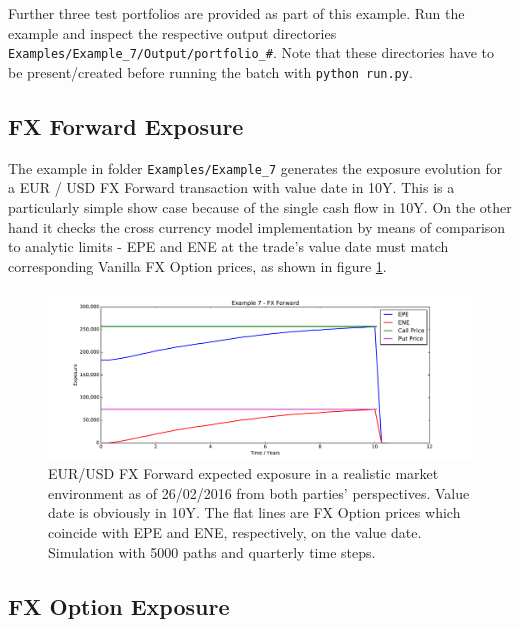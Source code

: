 \documentclass[12pt, a4paper]{article}
\begin{document}
Further three test portfolios are provided as part of this example. Run the example and inspect the respective output
directories {\tt Examples/Example\_7/Output/portfolio\_\#}. Note that these directories have to be present/created
before running the batch with {\tt python run.py}.

\subsection{FX Forward Exposure}\label{sec:fxfwd}

The example in folder {\tt Examples/Example\_7} generates the exposure evolution for a EUR / USD FX Forward transaction
with value date in 10Y. This is a particularly simple show case because of the single cash flow in 10Y. On the other
hand it checks the cross currency model implementation by means of comparison to analytic limits - EPE and ENE at the
trade's value date must match corresponding Vanilla FX Option prices, as shown in figure \ref{fig_5}.
\begin{figure}[h]
\begin{center}
\includegraphics[scale=0.45]{mpl_fxforward.pdf}
\end{center}
\caption{EUR/USD FX Forward expected exposure in a realistic market environment as of 26/02/2016 from both parties'
  perspectives. Value date is obviously in 10Y. The flat lines are FX Option prices which coincide with EPE and ENE,
  respectively, on the value date. Simulation with 5000 paths and quarterly time steps.}
\label{fig_5}
\end{figure}

\subsection{FX Option Exposure}\label{sec:fxoption}
\end{document}
